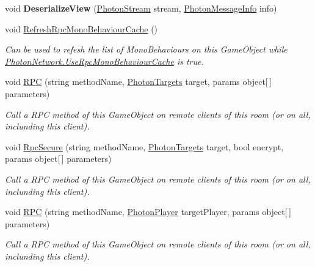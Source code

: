 \begin{DoxyCompactItemize}
\item 
void {\bfseries Deserialize\+View} (\hyperlink{class_photon_stream}{Photon\+Stream} stream, \hyperlink{class_photon_message_info}{Photon\+Message\+Info} info)\hypertarget{class_photon_view_a677557c203df8f79277095ce5f9da001}{}\label{class_photon_view_a677557c203df8f79277095ce5f9da001}

\item 
void \hyperlink{class_photon_view_a869710e081df022bbb4fa160e7ab9e0a}{Refresh\+Rpc\+Mono\+Behaviour\+Cache} ()
\begin{DoxyCompactList}\small\item\em Can be used to refesh the list of Mono\+Behaviours on this Game\+Object while \hyperlink{class_photon_network_a2ea887525d418e088bf99d303673d2f3}{Photon\+Network.\+Use\+Rpc\+Mono\+Behaviour\+Cache} is true. \end{DoxyCompactList}\item 
void \hyperlink{class_photon_view_ad288db13a15d581e0f7c5886f4036720}{R\+PC} (string method\+Name, \hyperlink{group__public_api_gab84b274b6aa3b3a3d7810361da16170f}{Photon\+Targets} target, params object\mbox{[}$\,$\mbox{]} parameters)
\begin{DoxyCompactList}\small\item\em Call a R\+PC method of this Game\+Object on remote clients of this room (or on all, inclunding this client). \end{DoxyCompactList}\item 
void \hyperlink{class_photon_view_a2950cb34198fa050a7e65a6b2f722c68}{Rpc\+Secure} (string method\+Name, \hyperlink{group__public_api_gab84b274b6aa3b3a3d7810361da16170f}{Photon\+Targets} target, bool encrypt, params object\mbox{[}$\,$\mbox{]} parameters)
\begin{DoxyCompactList}\small\item\em Call a R\+PC method of this Game\+Object on remote clients of this room (or on all, inclunding this client). \end{DoxyCompactList}\item 
void \hyperlink{class_photon_view_a6bc9726af14a8c7b8bdd7793c495a6e8}{R\+PC} (string method\+Name, \hyperlink{class_photon_player}{Photon\+Player} target\+Player, params object\mbox{[}$\,$\mbox{]} parameters)
\begin{DoxyCompactList}\small\item\em Call a R\+PC method of this Game\+Object on remote clients of this room (or on all, inclunding this client). \end{DoxyCompactList}\item 

\end{DoxyCompactItemize}
